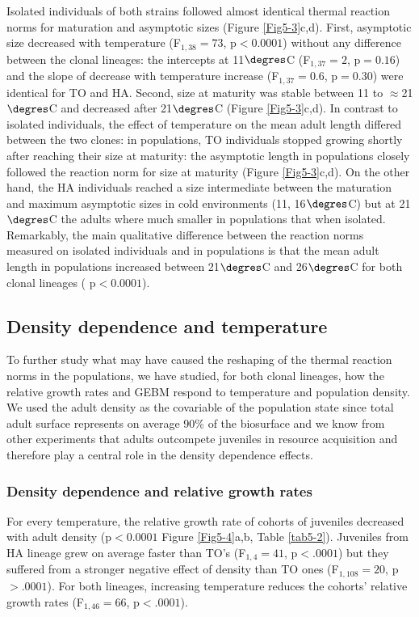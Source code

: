 Isolated individuals of both strains followed almost identical thermal reaction
norms for maturation and asymptotic sizes (Figure \ref{Fig5-3}c,d). First,
asymptotic size decreased with temperature (F$_{1,38}=73$, p$<0.0001$) without any
difference between the clonal lineages: the intercepts at 11$\degres$C (F$_{1,37}=2$,
p$=0.16$) and the slope of decrease with temperature increase
(F$_{1,37}=0.6$, p$=0.30$) were identical for TO and HA. Second, size at
maturity was stable between 11 to $\approx$21$\degres$C and decreased after 21$\degres$C
(Figure \ref{Fig5-3}c,d).
In contrast to isolated individuals, the effect of temperature on the mean adult length differed between the two clones:
in populations, TO individuals stopped growing shortly after reaching their size
at maturity: the asymptotic length in populations closely followed the reaction
norm for size at maturity (Figure \ref{Fig5-3}c,d). On the other hand, the HA individuals
reached a size intermediate between the maturation and maximum asymptotic sizes
in cold environments (11, 16$\degres$C) but at 21$\degres$C the adults where much smaller in
populations that when isolated. Remarkably, the main qualitative difference
between the reaction norms measured on isolated individuals and in populations
is that the mean adult length in populations increased between 21$\degres$C and 26$\degres$C for
both clonal lineages ( p$<0.0001$).

\subsection{Density dependence and temperature}

To further study what may have caused the reshaping of the thermal reaction
norms in the populations, we have studied, for both clonal lineages, how the
relative growth rates and GEBM respond to temperature and population density. We
used the adult density as the covariable of the population state since total
adult surface represents on average 90\% of the biosurface and we know from
other experiments that adults outcompete juveniles in resource acquisition and
therefore play a central role in the density dependence effects.

\subsubsection{Density dependence and relative growth rates}

For every temperature, the relative growth rate of cohorts of juveniles
decreased with adult density (p$<0.0001$ Figure \ref{Fig5-4}a,b, Table
\ref{tab5-2}). Juveniles from HA lineage grew on average faster than TO's
(F$_{1,4}=41$, p$<.0001$) but they suffered from a stronger negative effect of
density than TO ones (F$_{1,108}=20$, p$>.0001$).
For both lineages, increasing temperature reduces the cohorts’ relative growth
rates (F$_{1,46}=66$, p$<.0001$).

